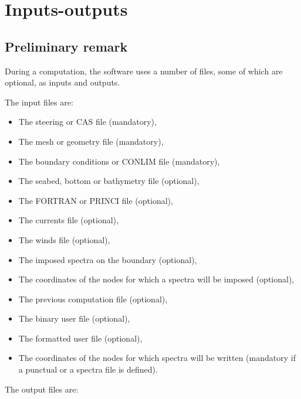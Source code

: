 \chapter{ Inputs-outputs}

\section{ Preliminary remark}

 During a computation, the \tomawac software uses a number of files, some of which are optional, as inputs and outputs.

 The input files are:

\begin{itemize}
\item  The steering or CAS file (mandatory),

\item  The mesh or geometry file (mandatory),

\item  The boundary conditions or CONLIM file (mandatory),

\item  The seabed, bottom or bathymetry file (optional),

\item  The FORTRAN or PRINCI file (optional),

\item  The currents file (optional),

\item  The winds file (optional),

\item The imposed spectra on the boundary (optional),

\item The coordinates of the nodes for which a spectra will be imposed (optional),

\item  The previous computation file (optional),

\item  The binary user file (optional),

\item  The formatted user file (optional),

\item The coordinates of the nodes for which spectra will be written (mandatory if a punctual or a spectra file is defined).
\end{itemize}

The output files are:

